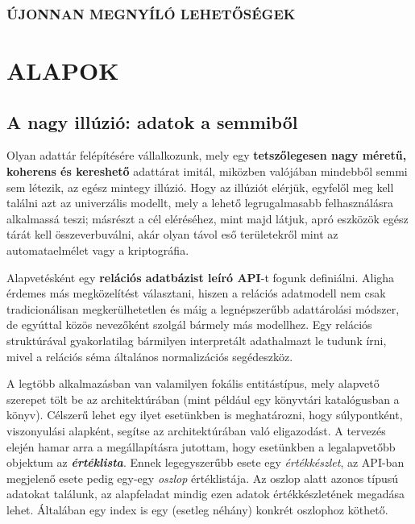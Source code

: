 \documentclass[
    parspace,
    noindent,
    nohyp,
]{elteiktdk}[2023/04/10]
\begin{document}



\subsection{ÚJONNAN MEGNYÍLÓ LEHETŐSÉGEK}










\chapter{ALAPOK}

\section{A nagy illúzió: adatok a semmiből}

Olyan adattár felépítésére vállalkozunk,
mely egy \textbf{tetszőlegesen nagy méretű, koherens és kereshető} adattárat imitál,
miközben valójában mindebből semmi sem létezik, az egész mintegy illúzió.
Hogy az illúziót elérjük, egyfelől meg kell találni azt az univerzális modellt,
mely a lehető legrugalmasabb felhasználásra alkalmassá teszi;
másrészt a cél eléréséhez, mint majd látjuk, apró eszközök egész tárát kell összeverbuválni,
akár olyan távol eső területekről mint az automataelmélet vagy a kriptográfia.


Alapvetésként egy \textbf{relációs adatbázist leíró API}-t fogunk definiálni.
Aligha érdemes más megközelítést választani,
hiszen a relációs adatmodell nem csak tradicionálisan megkerülhetetlen
és máig a legnépszerűbb adattárolási módszer,
de egyúttal közös nevezőként szolgál bármely más modellhez.
Egy relációs struktúrával gyakorlatilag bármilyen interpretált adathalmazt le tudunk írni,
mivel a relációs séma általános normalizációs segédeszköz.

A legtöbb alkalmazásban van valamilyen fokális entitástípus,
mely alapvető szerepet tölt be az architektúrában
(mint például egy könyvtári katalógusban a könyv).
Célszerű lehet egy ilyet esetünkben is meghatározni,
hogy súlypontként, viszonyulási alapként, segítse az architektúrában való eligazodást.
A tervezés elején hamar arra a megállapításra jutottam,
hogy esetünkben a legalapvetőbb objektum az \textbf{\textit{értéklista}}.
Ennek legegyszerűbb esete egy \textit{értékkészlet},
az API-ban megjelenő esete pedig egy-egy \textit{oszlop} értéklistája.
Az oszlop alatt azonos típusú adatokat találunk,
az alapfeladat mindig ezen adatok értékkészletének megadása lehet.
Általában egy index is egy (esetleg néhány) konkrét oszlophoz köthető.
\end{document}
